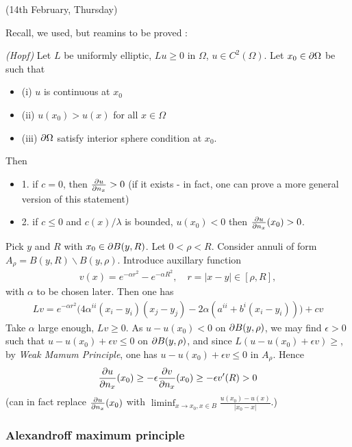 \documentclass[12pt,a4paper]{article}
\newenvironment{proof}
{\begin{changemargin}{1cm}{0.5cm} 
	}%
	{\end{changemargin}
}
\renewenvironment{i}
{\begin{itemize} 
	}%
	{\end{itemize}
}
\newenvironment{p}
{\begin{proof} 
	}%
	{\end{proof}
}
\begin{document}
\newday

(14th February, Thursday)
\s

Recall, we used, but reamins to be proved :

\lem \emph{(Hopf)} Let $L$ be uniformly elliptic, $Lu \geq 0$ in $\Omega$, $u\in C^2(\Omega)$. Let $x_0 \in \partial \Omega$ be such that
\begin{i}
\item[(i)] $u$ is continuous at $x_0$
\item[(ii)] $u(x_0) > u(x)$ for all $x\in \Omega$
\item[(iii)] $\partial \Omega$ satisfy interior sphere condition at $x_0$. 
\end{i}
Then
\begin{i}
\item[1.] if $c=0$, then $\frac{\partial u}{\partial n_x} >0$ (if it exists - in fact, one can prove a more general version of this statement)
\item[2.] if $c\leq 0$ and $c(x)/\lambda$ is bounded, $u(x_0)<0$ then $\frac{\partial u}{\partial n_x}(x_0)>0$.
\end{i}
\begin{p}
\pf Pick $y$ and $R$ with $x_0 \in \partial B(y, R)$. Let $0< \rho < R$. Consider annuli of form $A_{\rho} = B(y, R) \backslash B(y, \rho)$. Introduce auxillary function
\begin{align*}
v(x) = e^{-\alpha r^2} - e^{-\alpha R^2}, \quad r=|x-y|\in [\rho, R],
\end{align*}
with $\alpha$ to be chosen later. Then one has
\begin{align*}
Lv = e^{-\alpha r^2} \Big( 4\alpha^{ii}(x_i -y_i)(x_j -y_j) - 2\alpha (a^{ii} + b^i (x_i - y_i)) \Big) + cv
\end{align*}
Take $\alpha$ large enough, $Lv \geq 0$. As $u - u(x_0) < 0$ on $\partial B(y, \rho)$, we may find $\epsilon >0$ such that $u - u(x_0) + \epsilon v \leq 0$ on $\partial B(y, \rho)$, and since $L(u-u(x_0)+ \epsilon v) \geq$, by \emph{Weak Mamum Principle}, one has $u - u(x_0) + \epsilon v\leq 0$ in $A_{\rho}$. Hence
\begin{align*}
\frac{\partial u}{\partial n_x}(x_0)\geq - \epsilon \frac{\partial v}{\partial n_x}(x_0) \geq - \epsilon v'(R) > 0
\end{align*}
(can in fact replace $\frac{\partial u}{\partial n_x}(x_0)$ with $\liminf_{x\rightarrow x_0, x\in B}\frac{u(x_0)- u(x)}{|x_0 - x|}$.)

\eop
\end{p}
\s

\subsubsection*{Alexandroff maximum principle}
\end{document}
